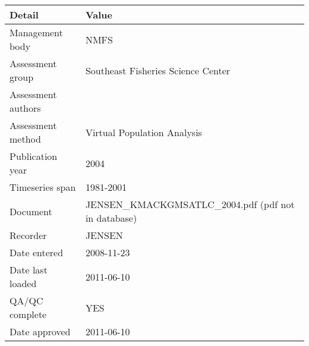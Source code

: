 \begin{table}[htb]
\centering
\begin{tabular}{lp{7cm}}
\toprule
Detail & Value \\
\midrule
Management body    & NMFS                                                 \\
Assessment group   & Southeast Fisheries Science Center                   \\
Assessment authors &                                                      \\
Assessment method  & Virtual Population Analysis                          \\
Publication year   & 2004                                                 \\
Timeseries span    & 1981-2001                                            \\
Document           & JENSEN\_KMACKGMSATLC\_2004.pdf (pdf not in database) \\
Recorder           & JENSEN                                               \\
Date entered       & 2008-11-23                                           \\
Date last loaded   & 2011-06-10                                           \\
QA/QC complete     & YES                                                  \\
Date approved      & 2011-06-10                                           \\
\bottomrule
\end{tabular}
\label{tab:assessdet}
\end{table}
